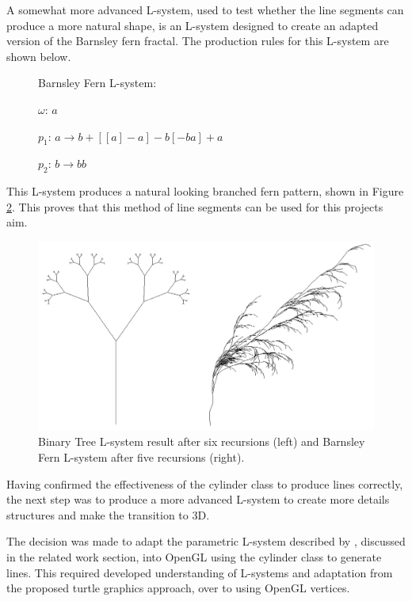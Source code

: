 \documentclass[final]{cmpreport}
\begin{document}
A somewhat more advanced L-system, used to test whether the line segments can produce a more natural 
shape, is an L-system designed to create an adapted version of the Barnsley fern fractal. The 
production rules for this L-system are shown below.

\begin{figure}[ht]
    Barnsley Fern L-system:

    $\omega$: $a$ 

    $p_1$: $a \rightarrow b+[[a]-a]-b[-ba]+a$

    $p_2$: $b \rightarrow bb$
    \label{fig:b-fern-string-system}
\end{figure}

This L-system produces a natural looking branched fern pattern, shown in Figure \ref{fig:b-tree-fern-string}. 
This proves that this method of line segments can be used for this projects aim.

\begin{figure}[ht]
    \includegraphics[scale=0.4]{b-tree-fern-string.png} 
    \centering
    \captionsetup{justification=centering}
    \caption{Binary Tree L-system result after six recursions (left) and Barnsley Fern L-system
             after five recursions (right).}
    \label{fig:b-tree-fern-string}
\end{figure}

Having confirmed the effectiveness of the cylinder class to produce lines correctly, the next 
step was to produce a more advanced L-system to create more details structures and make the 
transition to 3D. 

The decision was made to adapt the parametric L-system described by \cite{prusinkiewicz1996systems}, 
discussed in the related work section, into OpenGL using the cylinder class to generate lines. 
This required developed understanding of L-systems and adaptation from the proposed turtle graphics
approach, over to using OpenGL vertices.
\end{document}
